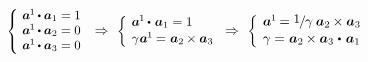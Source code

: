 \begin{otherlanguage}{russian}
\nopagebreak\vspace{-0.1em}\begin{equation*}
\scalebox{0.9}[0.9]{$\left\{\hspace{-0.16em}\begin{array}{l}
\bm{a}^{\hspace{-0.1ex}1} \hspace{-0.1ex} \dotp \bm{a}_{1} = 1 \\
\bm{a}^{\hspace{-0.1ex}1} \hspace{-0.1ex} \dotp \bm{a}_{2} = 0 \\
\bm{a}^{\hspace{-0.1ex}1} \hspace{-0.1ex} \dotp \bm{a}_{3} = 0 \\[0.05em]
\end{array}\right.$} \,\Rightarrow\hspace{0.32em}
%
\scalebox{0.92}[0.92]{$\left\{\hspace{-0.12em}\begin{array}{l}
\bm{a}^{\hspace{-0.1ex}1} \hspace{-0.1ex} \dotp \hspace{0.2ex} \bm{a}_{1} = 1 \\[0.1em]
\gamma \hspace{0.1ex} \bm{a}^{\hspace{-0.1ex}1} \hspace{-0.1ex} = \hspace{0.1ex} \bm{a}_2 \hspace{-0.1ex} \times \bm{a}_3 \\[0.08em]
\end{array}\right.$} \Rightarrow\hspace{0.32em}
%
\scalebox{0.96}[0.96]{$\left\{\hspace{-0.11em}\begin{array}{l}
\bm{a}^{\hspace{-0.1ex}1} \hspace{-0.2ex} =
\displaystyle \nicefrac{\scalebox{0.95}{$1$}\hspace{0.1ex}}{\scalebox{1.02}{$\gamma$}} \hspace{0.5ex} \bm{a}_2 \hspace{-0.1ex} \times \bm{a}_3 \hspace{0.1ex} \\[0.08em]
\gamma = \hspace{0.1ex} \bm{a}_2 \hspace{-0.1ex} \times \bm{a}_3 \hspace{0.1ex} \dotp \hspace{0.25ex} \bm{a}_{1} \\[0.08em]
\end{array}\right.$}
\end{equation*}


\end{otherlanguage}
